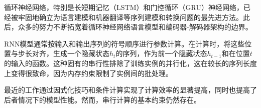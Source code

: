 
循环神经网络，特别是长短期记忆（LSTM）\citep{hochreiter1997}和门控循环（GRU）\citep{gruEval14}神经网络，已经被牢固地确立为语言建模和机器翻译等序列建模和转换问题的最先进方法\citep{sutskever14, bahdanau2014neural, cho2014learning}。此后，众多的努力不断拓宽着循环神经网络语言模型和编码器-解码器架构的边界\citep{wu2016google,luong2015effective,jozefowicz2016exploring}。


RNN模型通常按输入和输出序列的符号顺序进行参数计算。在计算时，将这些位置与步长对齐，生成一个隐藏状态$h_t$的序列，作为前一个隐藏状态$h_{t-1}$和在位置$t$的输入的函数。这种固有的串行性排除了训练实例的并行化，这在较长的序列长度上变得很致命，因为内存约束限制了实例间的批处理。


最近的工作通过因式化技巧\citep{Kuchaiev2017Factorization}和条件计算\citep{shazeer2017outrageously}实现了计算效率的显著提高，同时也提高了后者情况下的模型性能。然而，串行计算的基本约束仍然存在。


